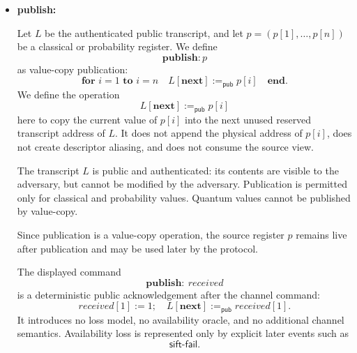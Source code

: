 \documentclass[acmsmall,screen,review,anonymous,nonacm]{acmart}
\theoremstyle{defn_style}
\begin{document}
\begin{itemize}
    \item \textbf{publish:}

    Let \(L\) be the authenticated public transcript, and let
    \(p=(p[1],\ldots,p[n])\) be a classical or probability register. We define
    \[
    \mathbf{publish: }p
    \]
    as value-copy publication:
    \[
    \textbf{for } i=1 \textbf{ to } i=n
    \quad
    L[\mathbf{next}] :=_{\mathsf{pub}} p[i]
    \quad
    \textbf{end}.
    \]
    We define the operation
    \[
    L[\mathbf{next}] :=_{\mathsf{pub}} p[i]
    \]
    here to copy the current value of \(p[i]\) into the next unused reserved
    transcript address of \(L\). It does not append the physical address of
    \(p[i]\), does not create descriptor aliasing, and does not consume the
    source view.

    The transcript \(L\) is public and authenticated: its contents are visible
    to the adversary, but cannot be modified by the adversary. Publication is
    permitted only for classical and probability values. Quantum values cannot
    be published by value-copy.

    Since publication is a value-copy operation, the source register \(p\)
    remains live after publication and may be used later by the protocol.

    The displayed command
    \[
    \mathbf{publish:}~received
    \]
    is a deterministic public acknowledgement after the channel command:
    \[
    received[1] := 1;\quad
    L[\mathbf{next}] :=_{\mathsf{pub}} received[1].
    \]
    It introduces no loss model, no availability oracle, and no additional channel
    semantics.  Availability loss is represented only by explicit later events such
    as
    \[
    \mathsf{sift\mbox{-}fail}.
    \]
    

\end{itemize}
\end{document}
